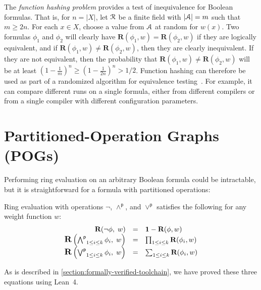 \documentclass[letterpaper,USenglish,cleveref, autoref, thm-restate]{lipics-v2021}
\newcommand{\pand}{\mathbin{\land^\textsf{p}}}
\newcommand{\por}{\mathbin{\lor^\textsf{p}}}
\DeclareMathOperator*{\Pand}{\bigwedge^\textsf{p}}
\DeclareMathOperator*{\Por}{\bigvee^\textsf{p}}
\newcommand{\boolnot}{\neg}
\newcommand{\varset}{X}
\newcommand{\ring}{{\cal R}}
\newcommand{\dset}{{\cal A}}
\newcommand{\rep}{\textbf{R}}
\newcommand{\mulident}{\textbf{1}}
\newcommand{\lean}{Lean~4}
\begin{document}
The \emph{function hashing problem} provides a test
of inequivalence for Boolean formulas.  That is, for $n = |\varset|$, let $\ring$ be a
finite  field with $|\dset| = m$ such that $m \geq 2 n$.  For each $x \in \varset$, choose a value from $\dset$ at random for $w(x)$.  Two formulas
$\phi_1$ and $\phi_2$ will clearly have $\rep(\phi_1, w) = \rep(\phi_2, w)$
if they are logically equivalent,
and if $\rep(\phi_1, w) \not = \rep(\phi_2, w)$, then they are clearly inequivalent.
If they are not equivalent, then
the probability that $\rep(\phi_1, w) \not = \rep(\phi_2, w)$ will be at
least $\left(1-\frac{1}{m}\right)^n \geq \left(1-\frac{1}{2n}\right)^n > 1/2$.
Function hashing can therefore be used as part of a
randomized algorithm for equivalence testing~\cite{blum:ipl:1980}.
For example, it can compare different runs on a single formula,
either from different compilers or from a single compiler with different configuration parameters.


\section{Partitioned-Operation Graphs (POGs)}
\label{sect:pog}

Performing ring evaluation on an arbitrary Boolean formula could be intractable, but it is straightforward for a formula with partitioned operations:
\begin{proposition}
\label{prop:ring:eval}
Ring evaluation with operations $\boolnot$, $\pand$, and $\por$ satisfies the following for any weight function $w$:
\begin{displaymath}
\begin{array}{rcl}
\rep(\boolnot \phi,\; w) &=& \mulident - \rep(\phi, w) \\
\textstyle
\scalebox{1.2}{\rep}\left(\Pand_{1 \leq i \leq k} \phi_i,\; w \right) &=& \prod_{1 \leq i \leq k} \rep(\phi_i, w) \\
\textstyle
\scalebox{1.2}{\rep}\left(\Por_{1 \leq i \leq k} \phi_i,\; w\right) &=& \sum_{1 \leq i \leq k} \rep(\phi_i, w) \\
\end{array}
\end{displaymath}
\end{proposition}
As is described in \cref{section:formally-verified-toolchain}, we have proved these three equations using \lean{}.
\end{document}
